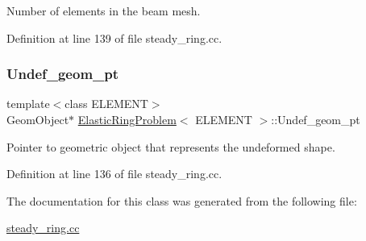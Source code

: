 Number of elements in the beam mesh. 



Definition at line 139 of file steady\+\_\+ring.\+cc.

\mbox{\label{classElasticRingProblem_a08e4afcece28aee2d1ee2e6c54394be8}} 
\subsubsection{\texorpdfstring{Undef\+\_\+geom\+\_\+pt}{Undef\_geom\_pt}}
{\footnotesize\ttfamily template$<$class E\+L\+E\+M\+E\+NT$>$ \\
Geom\+Object$\ast$ \hyperlink{classElasticRingProblem}{Elastic\+Ring\+Problem}$<$ E\+L\+E\+M\+E\+NT $>$\+::Undef\+\_\+geom\+\_\+pt\hspace{0.3cm}{\ttfamily [private]}}



Pointer to geometric object that represents the undeformed shape. 



Definition at line 136 of file steady\+\_\+ring.\+cc.



The documentation for this class was generated from the following file\+:\begin{DoxyCompactItemize}
\item 
\hyperlink{steady__ring_8cc}{steady\+\_\+ring.\+cc}\end{DoxyCompactItemize}
